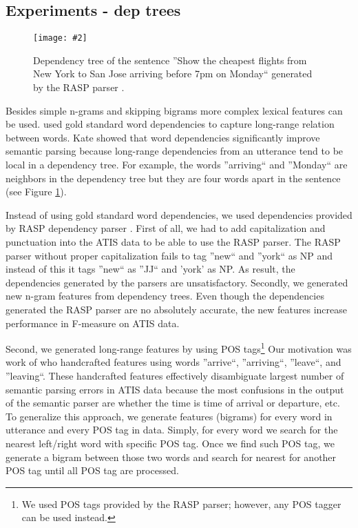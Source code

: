 \documentclass[11pt]{article}
\newcommand{\fgrparam}[4]{
  \begin{figure}[htbp]
    \begin{center}
      \leavevmode
      \texttt{[image: \#2]}
    \end{center}
    \caption{#4}
    \label{#3}
  \end{figure}
}
\begin{document}
\subsection{Experiments - dep trees}

\fgrparam{width=5cm}{./fig/dep-tree.pdf}{fig:dep:tree}{Dependency tree of the sentence ''Show the cheapest flights from New York to San Jose arriving before 7pm on Monday`` generated by the RASP parser \cite{rasp06}.}

Besides simple n-grams and skipping bigrams more complex lexical features can be used. \cite{kate08} used gold standard word dependencies to capture long-range relation between words. Kate showed that word dependencies significantly improve semantic parsing because long-range dependencies from an utterance tend to be local in a dependency tree. For example, the words ''arriving`` and ''Monday`` are neighbors in the dependency tree but they are four words apart in the sentence (see Figure \ref{fig:dep:tree}).

Instead of using gold standard word dependencies, we used dependencies provided by RASP dependency parser \cite{rasp06}. First of all, we had to add capitalization and punctuation into the ATIS data to be able to use the RASP parser. The RASP parser without proper capitalization fails to tag ''new`` and ''york`` as NP and instead of this it tags ''new`` as ''JJ`` and 'york' as NP. As result, the dependencies generated by the parsers are unsatisfactory. Secondly, we generated new n-gram features from dependency trees. Even though the dependencies generated the RASP parser are no absolutely accurate, the new features increase performance in F-measure on ATIS data.

Second, we generated long-range features by using POS tags\footnote{We used POS tags provided by the RASP parser; however, any POS tagger can be used instead.} 
Our motivation was work of \cite{meza08} who handcrafted features using words ''arrive``, ''arriving``, ''leave``, and ''leaving``. These handcrafted features effectively disambiguate largest number of semantic parsing errors in ATIS data because the most confusions in the output of the semantic parser are whether the time is time of arrival or departure, etc. To generalize this approach, we generate features (bigrams) for every word in utterance and every POS tag in data. Simply, for every word we search for the nearest left/right word with specific POS tag. Once we find such POS tag, we generate a bigram between those two words and search for nearest for another POS tag until all POS tag are processed. 
\end{document}
